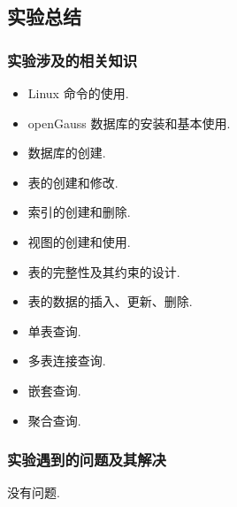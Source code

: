 \subsection{实验总结}

\subsubsection{实验涉及的相关知识}

\begin{itemize}
  \item Linux 命令的使用.
  \item openGauss 数据库的安装和基本使用.
  \item 数据库的创建.
  \item 表的创建和修改.
  \item 索引的创建和删除.
  \item 视图的创建和使用.
  \item 表的完整性及其约束的设计.
  \item 表的数据的插入、更新、删除.
  \item 单表查询.
  \item 多表连接查询.
  \item 嵌套查询.
  \item 聚合查询.
\end{itemize}

\subsubsection{实验遇到的问题及其解决}
没有问题.
